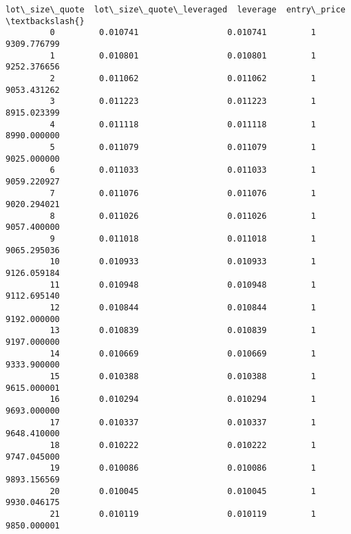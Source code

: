 \documentclass[11pt]{article}
\begin{document}
\begin{Verbatim}[commandchars=\\\{\}]
             lot\_size\_quote  lot\_size\_quote\_leveraged  leverage  entry\_price  \textbackslash{}
         0         0.010741                  0.010741         1  9309.776799   
         1         0.010801                  0.010801         1  9252.376656   
         2         0.011062                  0.011062         1  9053.431262   
         3         0.011223                  0.011223         1  8915.023399   
         4         0.011118                  0.011118         1  8990.000000   
         5         0.011079                  0.011079         1  9025.000000   
         6         0.011033                  0.011033         1  9059.220927   
         7         0.011076                  0.011076         1  9020.294021   
         8         0.011026                  0.011026         1  9057.400000   
         9         0.011018                  0.011018         1  9065.295036   
         10        0.010933                  0.010933         1  9126.059184   
         11        0.010948                  0.010948         1  9112.695140   
         12        0.010844                  0.010844         1  9192.000000   
         13        0.010839                  0.010839         1  9197.000000   
         14        0.010669                  0.010669         1  9333.900000   
         15        0.010388                  0.010388         1  9615.000001   
         16        0.010294                  0.010294         1  9693.000000   
         17        0.010337                  0.010337         1  9648.410000   
         18        0.010222                  0.010222         1  9747.045000   
         19        0.010086                  0.010086         1  9893.156569   
         20        0.010045                  0.010045         1  9930.046175   
         21        0.010119                  0.010119         1  9850.000001   
         

\end{Verbatim}
\end{document}
